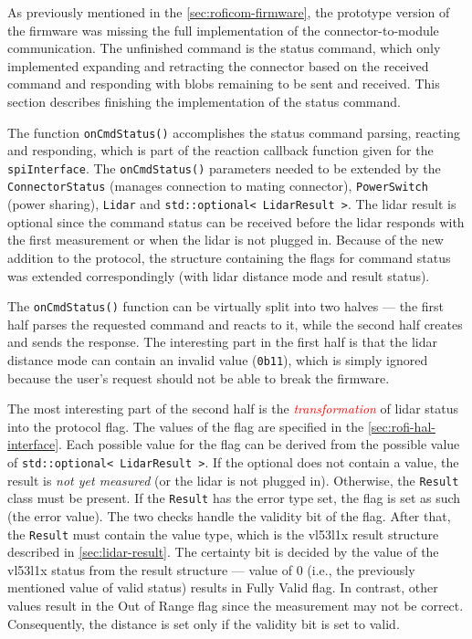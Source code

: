 \documentclass[
  digital,     %
  oneside,     %
  nosansbold,  %
  nocolorbold, %
  nolof,         %
  nolot,         %
]{fithesis4}
\newcommand{\TODO}[1]{\textcolor{red}{\textit{#1}}}
\begin{document}
{{{As previously mentioned in the \autoref{sec:roficom-firmware}, the prototype version of the firmware was missing the full implementation of the connector-to-module communication. The unfinished command is the status command, which only implemented expanding and retracting the connector based on the received command and responding with blobs remaining to be sent and received. This section describes finishing the implementation of the status command.

The function \lstinline|onCmdStatus()| accomplishes the status command parsing, reacting and responding, which is part of the reaction callback function given for the \lstinline|spiInterface|. The \lstinline|onCmdStatus()| parameters needed to be extended by the \lstinline|ConnectorStatus| (manages connection to mating connector), \lstinline|PowerSwitch| (power sharing), \lstinline|Lidar| and \lstinline|std::optional< LidarResult >|. The \acrshort{lidar} result is optional since the command status can be received before the \acrshort{lidar} responds with the first measurement or when the \acrshort{lidar} is not plugged in. Because of the new addition to the protocol, the structure containing the flags for command status was extended correspondingly (with \acrshort{lidar} distance mode and result status).

The \lstinline|onCmdStatus()| function can be virtually split into two halves --- the first half parses the requested command and reacts to it, while the second half creates and sends the response. The interesting part in the first half is that the \acrshort{lidar} distance mode can contain an invalid value (\lstinline|0b11|), which is simply ignored because the user's request should not be able to break the firmware.

The most interesting part of the second half is the \TODO{transformation} of \acrshort{lidar} status into the protocol flag. The values of the flag are specified in the \autoref{sec:rofi-hal-interface}. Each possible value for the flag can be derived from the possible value of \lstinline|std::optional< LidarResult >|. If the optional does not contain a value,  the result is \emph{not yet measured} (or the \acrshort{lidar} is not plugged in). Otherwise, the \lstinline|Result| class must be present. If the \lstinline|Result| has the error type set, the flag is set as such (the error value). The two checks handle the validity bit of the flag. After that, the \lstinline|Result| must contain the value type, which is the \gls{vl53l1x} result structure described in \autoref{sec:lidar-result}. The certainty bit is decided by the value of the \gls{vl53l1x} status from the result structure --- value of $0$ (i.e., the previously mentioned value of valid status) results in Fully Valid flag. In contrast, other values result in the Out of Range flag since the measurement may not be correct. Consequently, the distance is set only if the validity bit is set to valid.


}}}
\end{document}
